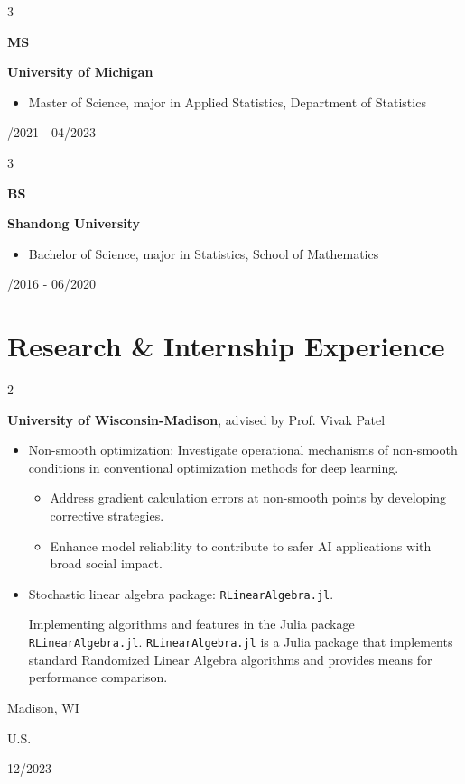 \documentclass[10pt, letterpaper]{article}
\newenvironment{highlights}{
    \begin{itemize}[
        topsep=0.10 cm,
        parsep=0.10 cm,
        partopsep=0pt,
        itemsep=0pt,
        leftmargin=0.4 cm + 10pt
    ]
}{
    \end{itemize}
} %
\newenvironment{twocolentry}[2][]{
    \onecolentry
    \def\secondColumn{#2}
    \setcolumnwidth{\fill, 4.5 cm}
    \begin{paracol}{2}
}{
    \switchcolumn \raggedleft \secondColumn
    \end{paracol}
    \endonecolentry
} %
\newenvironment{threecolentry}[3][]{
    \onecolentry
    \def\thirdColumn{#3}
    \setcolumnwidth{1 cm, \fill, 4.5 cm}
    \begin{paracol}{3}
    {\raggedright #2} \switchcolumn
}{
    \switchcolumn \raggedleft \thirdColumn
    \end{paracol}
    \endonecolentry
} %
\begin{document}
        \begin{threecolentry}{\textbf{MS}}{
            08/2021 - 04/2023
        }
            \textbf{University of Michigan}
            \begin{highlights}
                \item Master of Science, major in Applied Statistics, Department of Statistics
            \end{highlights}
        \end{threecolentry}

        
        \begin{threecolentry}{\textbf{BS}}{
            09/2016 - 06/2020
        }
            \textbf{Shandong University}
            \begin{highlights}
                \item Bachelor of Science, major in Statistics, School of Mathematics
            \end{highlights}
        \end{threecolentry}      


    
    \section{Research \& Internship Experience}



        
        \begin{twocolentry}{
            Madison, WI

            U.S.

            12/2023 - 
        }
            \textbf{University of Wisconsin-Madison}, advised by Prof. Vivak Patel
            \begin{highlights}
                \item Non-smooth optimization: Investigate operational mechanisms of non-smooth conditions in conventional optimization methods for deep learning.
                \begin{highlights}
                \item Address gradient calculation errors at non-smooth points by developing corrective strategies.
                \item Enhance model reliability to contribute to safer AI applications with broad social impact.
                \end{highlights}
                \item Stochastic linear algebra package: \texttt{RLinearAlgebra.jl}.
                
                Implementing algorithms and features in the Julia package \texttt{RLinearAlgebra.jl}. 
                \texttt{RLinearAlgebra.jl} is a Julia package that implements standard Randomized Linear Algebra 
                algorithms and provides means for performance comparison.
            \end{highlights}
        \end{twocolentry}
\end{document}
